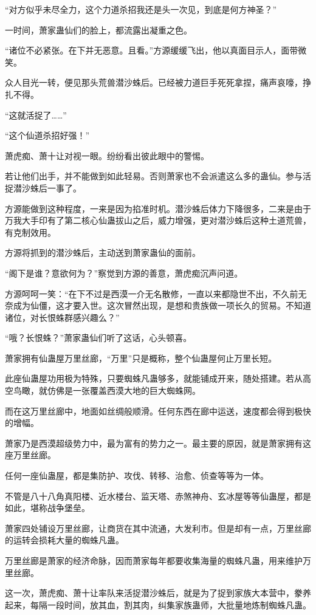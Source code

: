 \begin{this_body}
“对方似乎未尽全力，这个力道杀招我还是头一次见，到底是何方神圣？”

一时间，萧家蛊仙们的脸上，都流露出凝重之色。

“诸位不必紧张。在下并无恶意。且看。”方源缓缓飞出，他以真面目示人，面带微笑。

众人目光一转，便见那头荒兽潜沙蛛后。已经被力道巨手死死拿捏，痛声哀嚎，挣扎不得。

“这就活捉了……”

“这个仙道杀招好强！”

萧虎痴、萧十让对视一眼。纷纷看出彼此眼中的警惕。

若让他们出手，并不能做到如此轻易。否则萧家也不会派遣这么多的蛊仙。参与活捉潜沙蛛后一事了。

方源能做到这种程度，一来是因为掐准时机。潜沙蛛后体力下降很多，二来是由于万我大手印有了第二核心仙蛊拔山之后，威力增强，更对潜沙蛛后这种土道荒兽，有克制效用。

方源将抓到的潜沙蛛后，主动送到萧家蛊仙的面前。

“阁下是谁？意欲何为？”察觉到方源的善意，萧虎痴沉声问道。

方源呵呵一笑：“在下不过是西漠一介无名散修，一直以来都隐世不出，不久前无奈成为仙僵，这才要入世。这次冒然出现，是想和贵族做一项长久的贸易。不知道诸位，对长恨蛛群感兴趣么？”

“哦？长恨蛛？”萧家蛊仙们听了这话，心头顿喜。

萧家拥有仙蛊屋万里丝廊，“万里”只是概称，整个仙蛊屋何止万里长短。

此座仙蛊屋功用极为特殊，只要蜘蛛凡蛊够多，就能铺成开来，随处搭建。若从高空鸟瞰，就仿佛是一张覆盖西漠大地的巨大蜘蛛网。

而在这万里丝廊中，地面如丝绸般顺滑。任何东西在廊中运送，速度都会得到极快的增幅。

萧家乃是西漠超级势力中，最为富有的势力之一。最主要的原因，就是萧家拥有这座万里丝廊。

任何一座仙蛊屋，都是集防护、攻伐、转移、治愈、侦查等等为一体。

不管是八十八角真阳楼、近水楼台、监天塔、赤煞神舟、玄冰屋等等仙蛊屋，都是如此，堪称战争堡垒。

萧家四处铺设万里丝廊，让商货在其中流通，大发利市。但是却有一点，万里丝廊的运转会损耗大量的蜘蛛凡蛊。

万里丝廊是萧家的经济命脉，因而萧家每年都要收集海量的蜘蛛凡蛊，用来维护万里丝廊。

这一次，萧虎痴、萧十让率队来活捉潜沙蛛后，就是为了捉到家族大本营中，豢养起来，每隔一段时间，放其血，割其肉，纠集家族蛊师，大批量地炼制蜘蛛凡蛊。


\end{this_body}
